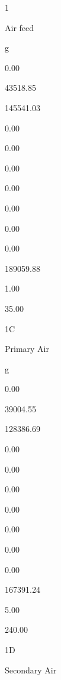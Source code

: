 \documentclass[a4paper,portrait,12pt]{article}
\begin{document}
1


\begin{flushleft}
Air feed
\end{flushleft}


\begin{flushleft}
g
\end{flushleft}


0.00


43518.85


145541.03


0.00


0.00


0.00


0.00


0.00


0.00


0.00


189059.88


1.00


35.00





\begin{flushleft}
1C
\end{flushleft}


\begin{flushleft}
Primary Air
\end{flushleft}


\begin{flushleft}
g
\end{flushleft}


0.00


39004.55


128386.69


0.00


0.00


0.00


0.00


0.00


0.00


0.00


167391.24


5.00


240.00





\begin{flushleft}
1D
\end{flushleft}


\begin{flushleft}
Secondary Air
\end{flushleft}
\end{document}
